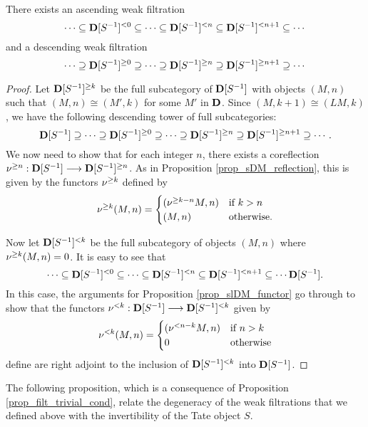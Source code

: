 \begin{thm}\label{thm_summary_dloc}
There exists an ascending weak filtration
\[
\cdots \subseteq \Corad{0}{\DCatLoc{S}} \subseteq \cdots \subseteq 
   \Corad{n}{\DCatLoc{S}} \subseteq \Corad{n + 1}{\DCatLoc{S}}
   \subseteq \cdots
\]
and a descending weak filtration
\[
\cdots \supseteq \Prerad{0}{\DCatLoc{S}} \supseteq \cdots \supseteq 
   \Prerad{n}{\DCatLoc{S}} \supseteq \Prerad{n + 1}{\DCatLoc{S}}
   \supseteq \cdots
\]
\end{thm}
\begin{proof}
Let $\Prerad{k}{\DCatLoc{S}}$ be the full subcategory of 
$\DCatLoc{S}$ with objects $(M, n)$ such that $(M, n) \cong
(M', k)$ for some $M'$ in $\DCat$. Since $(M, k + 1) \cong 
(LM, k)$, we have the following descending tower of full 
subcategories:
\[
\DCatLoc{S} \supseteq \cdots \supseteq \Prerad{0}{\DCatLoc{S}}
   \supseteq \cdots \supseteq \Prerad{n}{\DCatLoc{S}} \supseteq 
   \Prerad{n + 1}{\DCatLoc{S}} \supseteq \cdots.
\]
We now need to show that for each integer $n$, there exists a 
coreflection $\preradD{n}: \DCatLoc{S} \to \Prerad{n}{\DCatLoc{S}}$.
As in Proposition \ref{prop_sDM_reflection}, this is given by the
functors $\preradD{k}$ defined by
\[
\preradD{k}(M, n) = \begin{cases}
(\preradD{k - n}M, n) &\textrm{if }k > n\\
(M, n) &\textrm{otherwise}.
\end{cases}
\]

Now let $\Corad{k}{\DCatLoc{S}}$ be the full subcategory of
objects $(M, n)$ where $\preradD{k}(M, n) = 0$. It is easy to
see that
\[
\cdots \subseteq \Corad{0}{\DCatLoc{S}} \subseteq \cdots \subseteq 
   \Corad{n}{\DCatLoc{S}} \subseteq \Corad{n + 1}{\DCatLoc{S}}
   \subseteq \cdots \DCatLoc{S}.
\]
In this case, the arguments for Proposition 
\ref{prop_slDM_functor} go through to show that the 
functors $\coradD{k} : \DCatLoc{S}
\to \Corad{k}{\DCatLoc{S}}$ given by
\[
\coradD{k}(M, n) = \begin{cases}
(\coradD{n - k}M, n) &\textrm{if }n > k\\
0                    &\textrm{otherwise}
\end{cases}
\]
define are right adjoint to the inclusion of 
$\Corad{k}{\DCatLoc{S}}$ into $\DCatLoc{S}$.
\end{proof}

The following proposition, which is a consequence of Proposition 
\ref{prop_filt_trivial_cond}, relate the degeneracy of the weak 
filtrations that we defined above with the invertibility of the
Tate object $S$.

